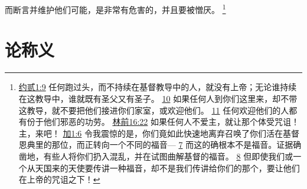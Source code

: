 \documentclass[12pt, a4paper, oneside]{ctexart}
\begin{document}
	而断言并维护他们可能，是非常有危害的，并且要被憎厌。
	\footnote {
		\href{https://biblehub.com/2_john/1-9.htm}{约贰1:9} 任何跑过头，而不持续在基督教导中的人，就没有上帝；无论谁持续在这教导中，谁就既有圣父又有圣子。
		\href{https://biblehub.com/2_john/1-10.htm}{10} 如果任何人到你们这里来，却不带这教导，就不要把他们接进你们家室，或欢迎他们。
		\href{https://biblehub.com/2_john/1-11.htm}{11} 任何欢迎他们的人都有份于他们邪恶的功劳。
		\href{https://biblehub.com/1_corinthians/16-22.htm}{林前16:22} 如果任何人不爱主，就让那个体受咒诅！主，来吧！
		\href{https://biblehub.com/galatians/1-6.htm}{加1:6} 令我震惊的是，你们竟如此快速地离弃召唤了你们活在基督恩典里的那位，而正转向一个不同的福音---
		\href{https://biblehub.com/galatians/1-7.htm}{7} 而这的确根本不是福音。证据确凿地，有些人将你们扔入混乱，并在试图曲解基督的福音。
		\href{https://biblehub.com/galatians/1-8.htm}{8} 但即使我们或一个从天国来的天使要传讲一种福音，却不是我们传讲给你们的那个，要让他们在上帝的咒诅之下！
	}

\section{论称义}
\end{document}
